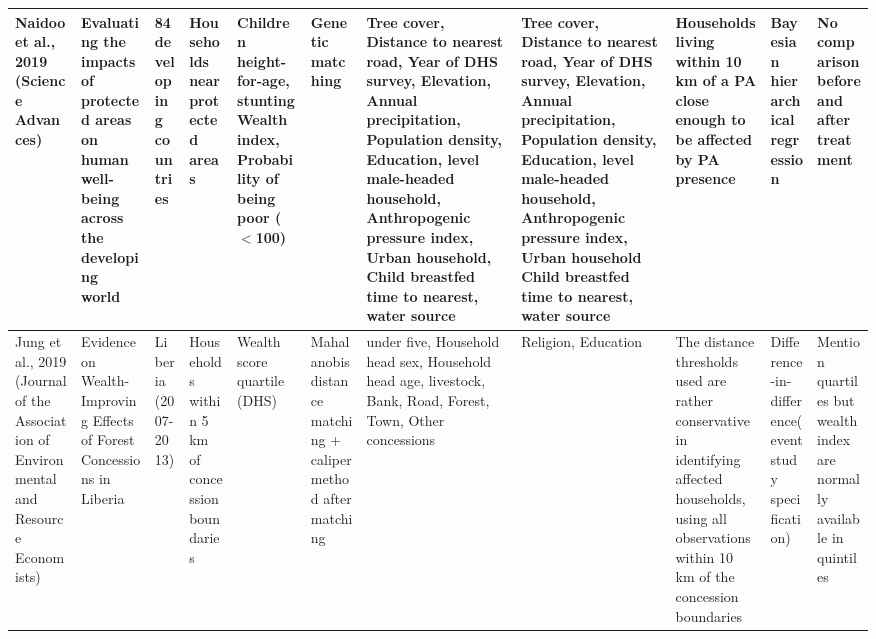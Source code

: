\documentclass[
]{article}
\begin{document}
\begin{landscape}
\begin{longtable}{|p{1.6cm}|p{1.5cm}|p{1.5cm}|p{1.5cm}|p{1.7cm}|p{1.6 cm}|p{1.9cm}|p{1.9cm}|p{2 cm}|p{1.5cm}|p{2 cm}|}
        Naidoo et al., 2019 (Science Advances) & Evaluating the impacts of protected areas on human well-being across the developing world & 84 developing countries & Households near protected areas & Children height-for-age, stunting Wealth index, Probability of being poor ($<$100) & Genetic matching & Tree cover, Distance to nearest road, Year of DHS survey, Elevation, Annual precipitation, Population density, Education, level male-headed household, Anthropogenic pressure index, Urban household, Child breastfed time to nearest, water source & Tree cover, Distance to nearest road, Year of DHS survey, Elevation, Annual precipitation, Population density, Education, level male-headed household, Anthropogenic pressure index, Urban household Child breastfed time to nearest, water source & Households living within 10 km of a PA close enough to be affected by PA presence & Bayesian hierarchical regression & No comparison before and after treatment\\ 
        \hline
        
        Jung et al., 2019 (Journal of the Association of Environmental and Resource Economists) & Evidence on Wealth-Improving Effects of Forest Concessions in Liberia & Liberia (2007-2013) & Households within 5 km of concession boundaries & Wealth score quartile (DHS) & Mahalanobis distance matching + caliper method after matching & under five, Household head sex, Household head age, livestock, Bank, Road, Forest, Town, Other concessions & Religion, Education & The distance thresholds used are rather conservative in identifying affected households, using all observations within 10 km of the concession boundaries & Difference-in-difference(event study specification) & Mention quartiles but wealth index are normally available in quintiles \\ 
        \hline
        

\end{longtable}
\end{landscape}
\end{document}
